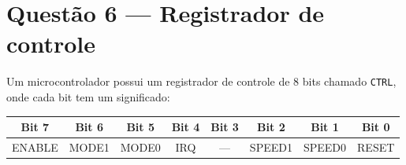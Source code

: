 \documentclass[12pt,a4paper]{article}
\newif\ifmostrarrespostas
\begin{document}
\ifmostrarrespostas
\begin{tcolorbox}[colback=red!5, colframe=red!40, title=\textbf{Resposta --- Questão 5}, fonttitle=\small]
\small
\begin{enumerate}[label=\alph*)]
\item ~\vspace{-6pt}
\begin{lstlisting}[style=code]
int bit_ligado(unsigned char byte, int pos) {
    return (byte >> pos) & 1;
}
\end{lstlisting}

\item ~\vspace{-6pt}
\begin{lstlisting}[style=code]
unsigned char ligar_bit(unsigned char byte, int pos) {
    return byte | (1 << pos);
}
\end{lstlisting}

\item ~\vspace{-6pt}
\begin{lstlisting}[style=code]
unsigned char desligar_bit(unsigned char byte, int pos) {
    return byte & ~(1 << pos);
}
\end{lstlisting}

\item ~\vspace{-6pt}
\begin{lstlisting}[style=code]
unsigned char swap_nibbles(unsigned char byte) {
    return (byte << 4) | (byte >> 4);
}
\end{lstlisting}
\end{enumerate}
\end{tcolorbox}
\fi

\iffalse %
\section{Questão 6 --- Registrador de controle}

Um microcontrolador possui um registrador de controle de 8 bits chamado \texttt{CTRL}, onde cada bit tem um significado:

\begin{center}
\small
\begin{tabular}{cccccccc}
\toprule
Bit 7 & Bit 6 & Bit 5 & Bit 4 & Bit 3 & Bit 2 & Bit 1 & Bit 0 \\
\midrule
ENABLE & MODE1 & MODE0 & IRQ & --- & SPEED1 & SPEED0 & RESET \\
\bottomrule
\end{tabular}
\end{center}
\end{document}
